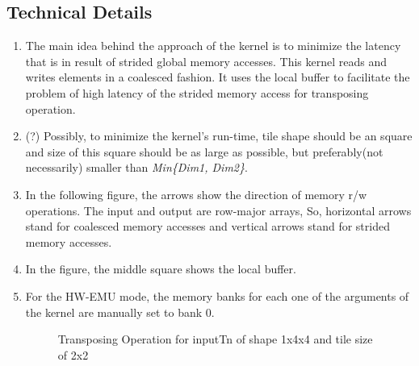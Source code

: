 \subsection{Technical Details}
\begin{enumerate}
\item The main idea behind the approach of the kernel is to minimize the latency that is in result of strided global memory accesses. This kernel reads and writes elements in a coalesced fashion. It uses the local buffer to facilitate the problem of high latency of the strided memory access for transposing operation.

\item (?) Possibly, to minimize the kernel's run-time, tile shape should be an square and size of this square should be as large as possible, but preferably(not necessarily) smaller than \emph{Min\{Dim1, Dim2\}}.

\item In the following figure, the arrows show the direction of memory r/w operations. The input and output are row-major arrays, So, horizontal arrows stand for coalesced memory accesses and vertical arrows stand for strided memory accesses.

\item In the figure, the middle square shows the local buffer.

\item For the HW-EMU mode, the memory banks for each one of the arguments of the kernel are manually set to bank 0.

\begin{figure}[h] 
\caption{Transposing Operation for inputTn of shape 1x4x4 and tile size of 2x2}
\label{fig:transpose01}
\centering
{}
\end{figure}
\end{enumerate}

